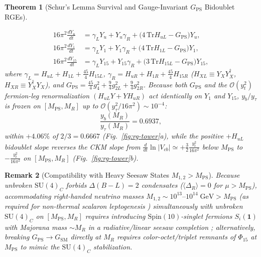 \documentclass[11pt,a4paper]{article}
\newtheorem{theorem}{Theorem}[section]
\newtheorem{remark}[theorem]{Remark}
\begin{document}
\begin{theorem}[Schur's Lemma Survival and Gauge-Invariant $G_{\mathrm{PS}}$ Bidoublet RGEs]
\begin{enumerate}[label=(\roman*),leftmargin=1.8em,itemsep=2pt]
\begin{align}
16\pi^2 \frac{dY_u}{dt} &= \gamma_L Y_u + Y_u \gamma_R + \big(4\,\mathrm{Tr}H_{uL} - G_{\mathrm{PS}}\big)Y_u, \nonumber\\
16\pi^2 \frac{dY_1}{dt} &= \gamma_L Y_1 + Y_1 \gamma_R + \big(4\,\mathrm{Tr}H_{1L} - G_{\mathrm{PS}}\big)Y_1, \label{eq:ps-yukawa-rge}\\
16\pi^2 \frac{dY_{15}}{dt} &= \gamma_L Y_{15} + Y_{15} \gamma_R + \big(3\,\mathrm{Tr}H_{15L} - G_{\mathrm{PS}}\big)Y_{15}, \nonumber
\end{align}
where $\gamma_L = H_{uL} + H_{1L} + \frac{45}{4}H_{15L}$, $\gamma_R = H_{uR} + H_{1R} + \frac{45}{4}H_{15R}$ ($H_{XL} \equiv Y_X Y_X^\dagger$, $H_{XR} \equiv Y_X^\dagger Y_X$), and $G_{\mathrm{PS}} = \frac{45}{4}g_4^2 + \frac{9}{4}g_{2L}^2 + \frac{9}{4}g_{2R}^2$. Because \emph{both} $G_{\mathrm{PS}}$ and the $\mathcal{O}(y_t^2)$ fermion-leg renormalization $(H_{uL} Y + Y H_{uR})$ act identically on $Y_1$ and $Y_{15}$, $y_b/y_\tau$ is frozen on $[M_{\mathrm{PS}}, M_R]$ up to $\mathcal{O}(y_\tau^2/16\pi^2) \sim 10^{-4}$:
\begin{equation}
\frac{y_b(M_R)}{y_\tau(M_R)} = \mathbf{0.6937},
\label{eq:ps-yb-ytau-MR}
\end{equation}
within $+4.06\%$ of $2/3 = 0.6667$ (Fig.~\ref{fig:rg-tower}a), while the positive $+H_{uL}$ bidoublet slope reverses the CKM slope from $\frac{d}{dt}\ln|V_{cb}| \simeq +\frac{3}{2}\frac{y_t^2}{16\pi^2}$ below $M_{\mathrm{PS}}$ to $-\frac{y_t^2}{16\pi^2}$ on $[M_{\mathrm{PS}}, M_R]$ (Fig.~\ref{fig:rg-tower}b).
\end{enumerate}
\end{theorem}

\begin{remark}[Compatibility with Heavy Seesaw States $M_{1,2} > M_{\mathrm{PS}}$]
\label{rem:seesaw-chain}
Because unbroken $\mathrm{SU}(4)_C$ forbids $\Delta(B - L) = 2$ condensates ($\langle\Delta_R\rangle = 0$ for $\mu > M_{\mathrm{PS}}$), accommodating right-handed neutrino masses $M_{1,2} \sim 10^{13}\text{--}10^{14}\;\mathrm{GeV} > M_{\mathrm{PS}}$ (as required for non-thermal scalaron leptogenesis \cite{Olcsak2026Paper24}) simultaneously with unbroken $\mathrm{SU}(4)_C$ on $[M_{\mathrm{PS}}, M_R]$ requires introducing $\mathrm{Spin}(10)$-singlet fermions $S_i(\mathbf{1})$ with Majorana mass $\sim M_R$ in a radiative/linear seesaw completion \cite{MalinskyRomaoValle2005}; alternatively, breaking $G_{\mathrm{PS}} \to G_{\mathrm{SM}}$ directly at $M_R$ requires color-octet/triplet remnants of $\Phi_{15}$ at $M_{\mathrm{PS}}$ to mimic the $\mathrm{SU}(4)_C$ stabilization.
\end{remark}
\end{document}
